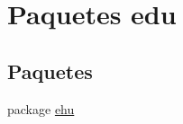 \hypertarget{a00018}{}\section{Paquetes edu}
\label{a00018}
\subsection*{Paquetes}
\begin{DoxyCompactItemize}
\item 
package \mbox{\hyperlink{a00019}{ehu}}
\end{DoxyCompactItemize}
